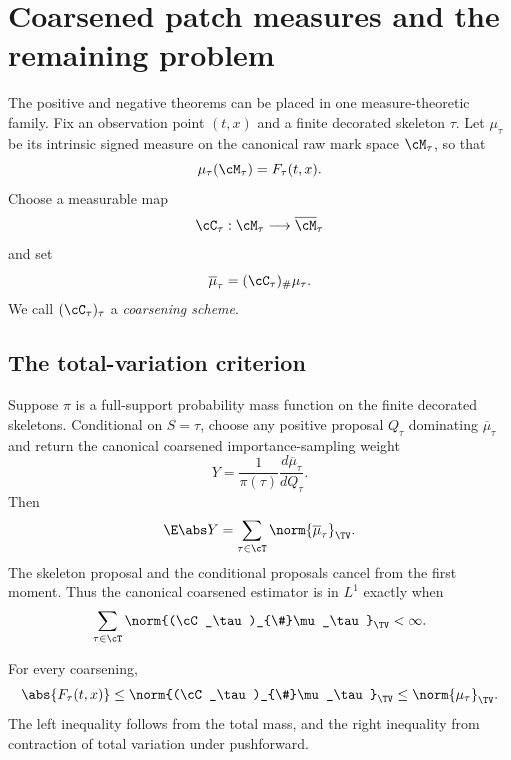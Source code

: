 \section{Coarsened patch measures and the remaining problem}
\label{sec:coarsening}

The positive and negative theorems can be placed in one measure-theoretic family. Fix an observation point $(t,x)$ and a finite decorated skeleton $\tau$. Let $\mu_\tau$ be its intrinsic signed measure on the canonical raw mark space $\cM_\tau$, so that
\begin{equation*}
  \mu_\tau(\cM_\tau)=F_\tau(t,x).
\end{equation*}
Choose a measurable map
\begin{equation*}
  \cC_\tau:\cM_\tau\longrightarrow\overline{\cM}_\tau
\end{equation*}
and set
\begin{equation}
  \overline\mu_\tau
  =
  (\cC_\tau)_{\#}\mu_\tau.
  \label{eq:coarsening-main}
\end{equation}
We call $(\cC_\tau)_\tau$ a \emph{coarsening scheme}.

\subsection{The total-variation criterion}

Suppose $\pi$ is a full-support probability mass function on the finite decorated skeletons. Conditional on $S=\tau$, choose any positive proposal $Q_\tau$ dominating $\overline\mu_\tau$ and return the canonical coarsened importance-sampling weight
\begin{equation*}
  Y
  =
  \frac1{\pi(\tau)}
  \frac{d\overline\mu_\tau}{dQ_\tau}.
\end{equation*}
Then
\begin{equation}
  \E\abs Y
  =
  \sum_{\tau\in\cT}
  \norm{\overline\mu_\tau}_{\TV}.
  \label{eq:coarsened-L1-sum}
\end{equation}
The skeleton proposal and the conditional proposals cancel from the first moment. Thus the canonical coarsened estimator is in $L^1$ exactly when
\begin{equation}
  \sum_{\tau\in\cT}
  \norm{(\cC_\tau)_{\#}\mu_\tau}_{\TV}
  <\infty.
  \label{eq:coarsening-open-sum}
\end{equation}

For every coarsening,
\begin{equation}
  \abs{F_\tau(t,x)}
  \leq
  \norm{(\cC_\tau)_{\#}\mu_\tau}_{\TV}
  \leq
  \norm{\mu_\tau}_{\TV}.
  \label{eq:coarsening-sandwich}
\end{equation}
The left inequality follows from the total mass, and the right inequality from contraction of total variation under pushforward.

